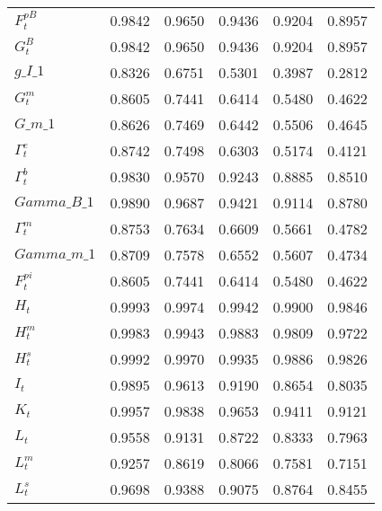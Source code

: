 \begin{center}
\begin{longtable}{lccccc}
$ F^{pB}_t          $	 & 	    0.9842	 & 	    0.9650	 & 	    0.9436	 & 	    0.9204	 & 	    0.8957 \\ 
$ G^B_t             $	 & 	    0.9842	 & 	    0.9650	 & 	    0.9436	 & 	    0.9204	 & 	    0.8957 \\ 
$g\_I\_1            $	 & 	    0.8326	 & 	    0.6751	 & 	    0.5301	 & 	    0.3987	 & 	    0.2812 \\ 
$ G^m_t             $	 & 	    0.8605	 & 	    0.7441	 & 	    0.6414	 & 	    0.5480	 & 	    0.4622 \\ 
$G\_m\_1            $	 & 	    0.8626	 & 	    0.7469	 & 	    0.6442	 & 	    0.5506	 & 	    0.4645 \\ 
$ \Gamma^e_t        $	 & 	    0.8742	 & 	    0.7498	 & 	    0.6303	 & 	    0.5174	 & 	    0.4121 \\ 
$ \Gamma^b_t        $	 & 	    0.9830	 & 	    0.9570	 & 	    0.9243	 & 	    0.8885	 & 	    0.8510 \\ 
$Gamma\_B\_1        $	 & 	    0.9890	 & 	    0.9687	 & 	    0.9421	 & 	    0.9114	 & 	    0.8780 \\ 
$ \Gamma^m_t        $	 & 	    0.8753	 & 	    0.7634	 & 	    0.6609	 & 	    0.5661	 & 	    0.4782 \\ 
$Gamma\_m\_1        $	 & 	    0.8709	 & 	    0.7578	 & 	    0.6552	 & 	    0.5607	 & 	    0.4734 \\ 
$ F^{pi}_t          $	 & 	    0.8605	 & 	    0.7441	 & 	    0.6414	 & 	    0.5480	 & 	    0.4622 \\ 
$ H_t               $	 & 	    0.9993	 & 	    0.9974	 & 	    0.9942	 & 	    0.9900	 & 	    0.9846 \\ 
$ H^m_t             $	 & 	    0.9983	 & 	    0.9943	 & 	    0.9883	 & 	    0.9809	 & 	    0.9722 \\ 
$ H^s_t             $	 & 	    0.9992	 & 	    0.9970	 & 	    0.9935	 & 	    0.9886	 & 	    0.9826 \\ 
$ I_t               $	 & 	    0.9895	 & 	    0.9613	 & 	    0.9190	 & 	    0.8654	 & 	    0.8035 \\ 
$ K_t               $	 & 	    0.9957	 & 	    0.9838	 & 	    0.9653	 & 	    0.9411	 & 	    0.9121 \\ 
$ L_t               $	 & 	    0.9558	 & 	    0.9131	 & 	    0.8722	 & 	    0.8333	 & 	    0.7963 \\ 
$ L^m_t             $	 & 	    0.9257	 & 	    0.8619	 & 	    0.8066	 & 	    0.7581	 & 	    0.7151 \\ 
$ L^s_t             $	 & 	    0.9698	 & 	    0.9388	 & 	    0.9075	 & 	    0.8764	 & 	    0.8455 \\ 

\end{longtable}
\end{center}
